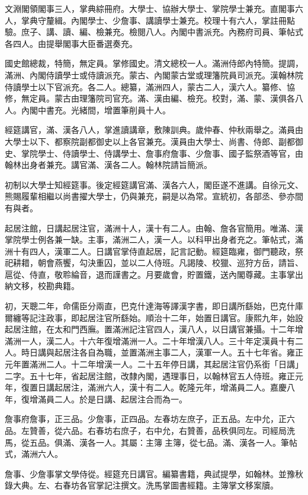 \begin{pinyinscope}
文淵閣領閣事三人，掌典綜冊府。大學士、協辦大學士、掌院學士兼充。直閣事六人，掌典守釐緝。內閣學士、少詹事、講讀學士兼充。校理十有六人，掌註冊點驗。庶子、講、讀、編、檢兼充。檢閱八人。內閣中書派充。內務府司員、筆帖式各四人。由提舉閣事大臣番選奏充。

國史館總裁，特簡，無定員。掌修國史。清文總校一人。滿洲侍郎內特簡。提調，滿洲、內閣侍讀學士或侍讀派充。蒙古、內閣蒙古堂或理籓院員司派充。漢翰林院侍讀學士以下官派充。各二人。總纂，滿洲四人，蒙古二人，漢六人。纂修、協修，無定員。蒙古由理籓院司官充。滿、漢由編、檢充。校對，滿、蒙、漢俱各八人。內閣中書充。光緒間，增置筆削員十人。

經筵講官，滿、漢各八人，掌進讀講章，敷陳訓典。歲仲春、仲秋兩舉之。滿員由大學士以下、都察院副都御史以上各官兼充。漢員由大學士、尚書、侍郎、副都御史、掌院學士、侍讀學士、侍講學士、詹事府詹事、少詹事、國子監祭酒等官，由翰林出身者兼充。講官滿、漢各二人。翰林院請旨簡派。

初制以大學士知經筵事。後定經筵講官滿、漢各六人，閣臣遂不進講。自徐元文、熊賜履輩相繼以尚書擢大學士，仍與兼充，嗣是以為常。宣統初，各部丞、參亦間有與者。

起居注館，日講起居注官，滿洲十人，漢十有二人。由翰、詹各官簡用。唯滿、漢掌院學士例各兼一缺。主事，滿洲二人，漢一人。以科甲出身者充之。筆帖式，滿洲十有四人，漢軍二人。日講官掌侍直起居，記言記動。經筵臨雍，御門聽政，祭祀耕耤，朝會燕饗，勾決重囚，並以二人侍班。凡謁陵、校獵、巡狩方岳，請旨、扈從、侍直，敬聆綸音，退而謹書之。月要歲會，貯置鐵，送內閣尊藏。主事掌出納文移，校勘典籍。

初，天聰二年，命儒臣分兩直，巴克什達海等譯漢字書，即日講所繇始，巴克什庫爾纏等記注政事，即起居注官所繇始。順治十二年，始置日講官。康熙九年，始設起居注館，在太和門西廡。置滿洲記注官四人，漢八人，以日講官兼攝。十二年增滿洲一人，漢二人。十六年復增滿洲一人。二十年增漢八人。三十年定漢員十有二人。時日講與起居注各自為職，並置滿洲主事二人，漢軍一人。五十七年省。雍正元年置滿洲二人。十二年增漢一人。二十五年停日講，其起居注官仍系銜「日講」二字。五十七年，省起居注館，改隸內閣，遇理事日，以翰林官五人侍班。雍正元年，復置日講起居注，滿洲六人，漢十有二人。乾隆元年，增滿員二人。嘉慶八年，復增滿員二人。於是日講、起居注合而為一。

詹事府詹事，正三品。少詹事，正四品。左春坊左庶子，正五品。左中允，正六品。左贊善，從六品。右春坊右庶子，右中允，右贊善，品秩俱同左。司經局洗馬，從五品。俱滿、漢各一人。其屬：主簿主簿，從七品。滿、漢各一人。筆帖式，滿洲六人。

詹事、少詹事掌文學侍從。經筵充日講官。編纂書籍，典試提學，如翰林。並豫秋錄大典。左、右春坊各官掌記注撰文。洗馬掌圖書經籍。主簿掌文移案牘。


\end{pinyinscope}
